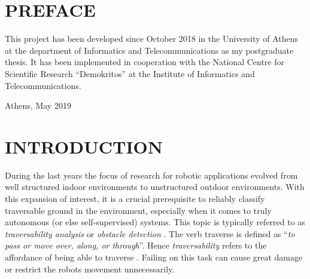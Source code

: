 \documentclass[12pt,a4paper,table,dvipsnames,tikz]{report}
\newcommand{\defn}[1]{\enquote{\textit{#1}}}
\newcommand{\term}{\textit}
\renewcommand{\headrulewidth}{0pt}
\begin{document}
	
	{
		\hypersetup{linkcolor=black}
		\renewcommand*\contentsname{CONTENTS}
		\renewcommand{\listfigurename}{LIST OF FIGURES}
		\renewcommand{\listtablename}{LIST OF TABLES}
		
		\clearpage                       %
		{                                %
			\pagestyle{empty}              %
			{
				\fancyhf{}%
				\renewcommand{\headrulewidth}{0pt}%
				\renewcommand{\footrulewidth}{0pt}%
			}
			\tableofcontents
			\listoftables
			\listoffigures
			\thispagestyle{empty}          %
		}
	}
	
	\chapter*{PREFACE}
	\thispagestyle{empty}
	This project has been developed since October 2018 in the University of Athens at 
	the department of Informatics and Telecommunications as my postgraduate thesis. It 
	has been implemented in cooperation with the National Centre for Scientific Research 
	\enquote{Demokritos} at the Institute of Informatics and Telecommunications.\\
	\begin{flushright}
		Athens, May 2019
	\end{flushright}
	
	
	\chapter{INTRODUCTION}
	\label{sec:intro}
	
	During the last years the focus of research for robotic applications evolved 
	from well structured indoor environments to unstructured outdoor environments. 
	With this expansion of interest, it is a crucial prerequisite to reliably 
	classify traversable ground in the environment, especially when it comes to 
	truly autonomous (or else self-supervised) systems. This topic is typically referred to as 
	\term{traversability analysis} or \term{obstacle detection} \citep{Suger}. The 
	verb traverse is defined as \defn{to pass or move over, along, or through}. 
	Hence \term{traversability} refers to the affordance of being able to traverse 
	\citep{Ugur}. Failing on this task can cause great damage or restrict the robots 
	movement unnecessarily.
	\\
	
\end{document}
